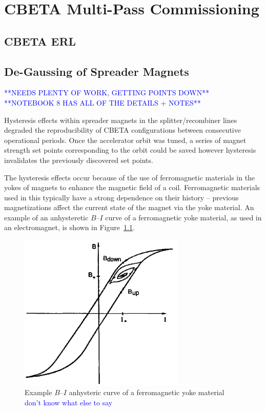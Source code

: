 \documentclass[../main.tex]{subfiles}
\begin{document}
\chapter{CBETA Multi-Pass Commissioning}
\label{CBETA_Multi-Pass_Commissioning} %

\section{CBETA ERL}

\section{De-Gaussing of Spreader Magnets}

\textcolor{blue}{**NEEDS PLENTY OF WORK, GETTING POINTS DOWN** \\ **NOTEBOOK 8 HAS ALL OF THE DETAILS + NOTES**}

Hysteresis effects within spreader magnets in the splitter/recombiner lines degraded the reproducibility of CBETA configurations between consecutive operational periods. Once the accelerator orbit was tuned, a series of magnet strength set points corresponding to the orbit could be saved however hysteresis invalidates the previously discovered set points.

The hysteresis effects occur because of the use of ferromagnetic materials in the yokes of magnets to enhance the magnetic field of a coil. Ferromagnetic materials used in this typically have a strong dependence on their history \cite{decker1991physical} -- previous magnetizations affect the current state of the magnet via the yoke material. An example of an anhysteretic $B$--$I$ curve of a ferromagnetic yoke material, as used in an electromagnet, is shown in Figure~\ref{fig:example_BI_curve}.

\begin{figure}[!h]
\centering
\includegraphics[width=0.7\textwidth]{Figures/CBETA_Multi-Pass_Commissioning/example_BI_curve.png}
\caption{Example $B$--$I$ anhysteric curve of a ferromagnetic yoke material \cite{decker1991physical} \textcolor{blue}{don't know what else to say}}
\label{fig:example_BI_curve}
\end{figure}
\end{document}

